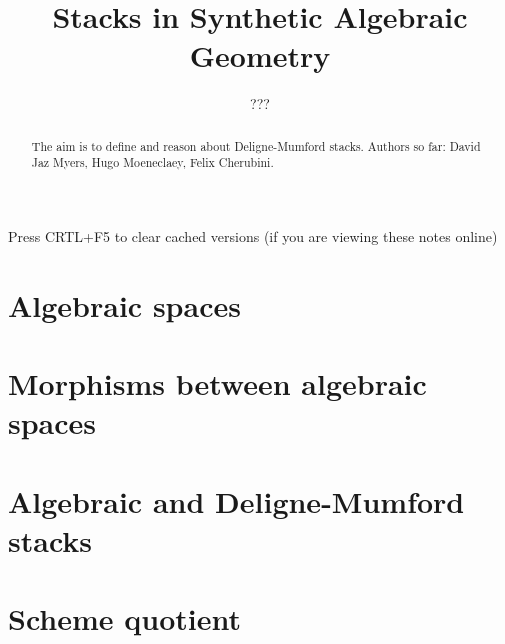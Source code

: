 \documentclass{../util/zariski}
\title{Stacks in Synthetic Algebraic Geometry}
\author{???}
\begin{document}
\maketitle

\begin{center}
  \color{purple}
  \large{Press CRTL+F5 to clear cached versions}
  \large{(if you are viewing these notes online)}
\end{center}

\begin{abstract}
  The aim is to define and reason about Deligne-Mumford stacks.
  Authors so far: David Jaz Myers, Hugo Moeneclaey, Felix Cherubini.
\end{abstract}

\tableofcontents

\section{Algebraic spaces}


\section{Morphisms between algebraic spaces}


\section{Algebraic and Deligne-Mumford stacks}


\section{Scheme quotient}


\printindex

\printbibliography
\end{document}
